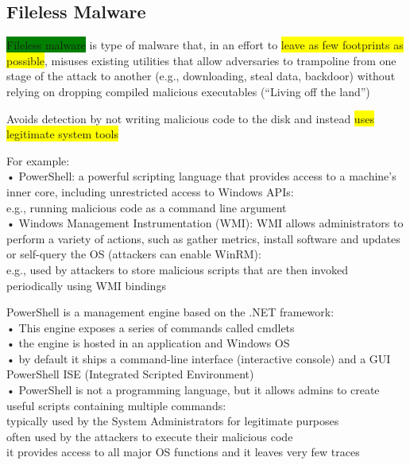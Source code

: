 \documentclass[]{project_plan}
\begin{document}
\subsection{Fileless Malware}
\colorbox{green}{Fileless malware} is type of malware that, in an effort to \colorbox{yellow}{leave as few footprints as possible}, misuses existing utilities
that allow adversaries to trampoline from one stage of the attack to another (e.g., downloading, steal data,
backdoor) without relying on dropping compiled malicious executables (“Living off the land”)

Avoids detection by not writing malicious code to the disk and instead \colorbox{yellow}{uses legitimate system tools}

For example:\\
• PowerShell: a powerful scripting language that provides access to a machine’s inner
core, including unrestricted access to Windows APIs:\\
e.g., running malicious code as a command line argument\\
• Windows Management Instrumentation (WMI): WMI allows administrators to perform a
variety of actions, such as gather metrics, install software and updates or self-query the OS
(attackers can enable WinRM):\\
e.g., used by attackers to store malicious scripts that are then invoked periodically using WMI bindings

PowerShell is a management engine based on the .NET framework:\\
• This engine exposes a series of commands called cmdlets\\
• the engine is hosted in an application and Windows OS\\
• by default it ships a command-line interface (interactive console) and a GUI PowerShell ISE
(Integrated Scripted Environment)\\
• PowerShell is not a programming language, but it allows admins to create useful scripts
containing multiple commands:\\
typically used by the System Administrators for legitimate purposes\\
often used by the attackers to execute their malicious code\\
it provides access to all major OS functions and it leaves very few traces
\end{document}
